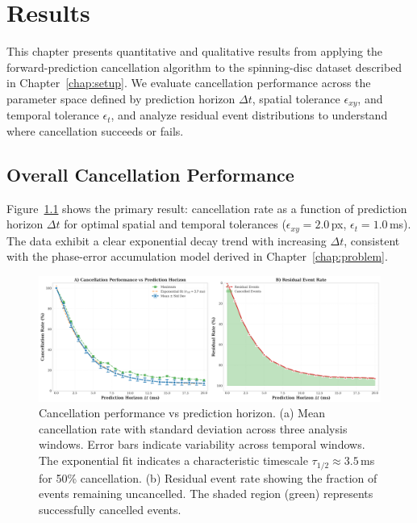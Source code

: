 \chapter{Results}\label{chap:results}

This chapter presents quantitative and qualitative results from applying the forward-prediction cancellation algorithm to the spinning-disc dataset described in Chapter~\ref{chap:setup}. We evaluate cancellation performance across the parameter space defined by prediction horizon $\Delta t$, spatial tolerance $\epsilon_{xy}$, and temporal tolerance $\epsilon_t$, and analyze residual event distributions to understand where cancellation succeeds or fails.

\section{Overall Cancellation Performance}

Figure~\ref{fig:cancellation_vs_dt} shows the primary result: cancellation rate as a function of prediction horizon $\Delta t$ for optimal spatial and temporal tolerances ($\epsilon_{xy}=2.0$\,px, $\epsilon_t=1.0$\,ms). The data exhibit a clear exponential decay trend with increasing $\Delta t$, consistent with the phase-error accumulation model derived in Chapter~\ref{chap:problem}.

\begin{figure}[t]
  \centering
  \includegraphics[width=0.95\linewidth]{../code/thesis_figures/figure_cancellation_vs_dt.png}
  \caption{Cancellation performance vs prediction horizon. (a) Mean cancellation rate with standard deviation across three analysis windows. Error bars indicate variability across temporal windows. The exponential fit indicates a characteristic timescale $\tau_{1/2} \approx 3.5$\,ms for 50\% cancellation. (b) Residual event rate showing the fraction of events remaining uncancelled. The shaded region (green) represents successfully cancelled events.}
  \label{fig:cancellation_vs_dt}
\end{figure}


